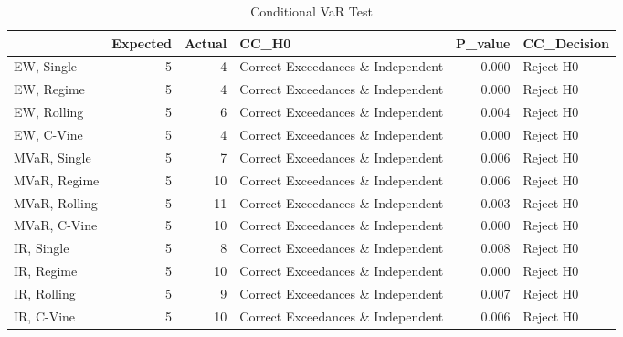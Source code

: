 \begin{table}

\caption{Conditional VaR Test}
\centering
\begin{tabular}[t]{lrrlrl}
\toprule
  & Expected & Actual & CC\_H0 & P\_value & CC\_Decision\\
\midrule
EW, Single & 5 & 4 & Correct Exceedances \& Independent & 0.000 & Reject H0\\
EW, Regime & 5 & 4 & Correct Exceedances \& Independent & 0.000 & Reject H0\\
EW, Rolling & 5 & 6 & Correct Exceedances \& Independent & 0.004 & Reject H0\\
EW, C-Vine & 5 & 4 & Correct Exceedances \& Independent & 0.000 & Reject H0\\
MVaR, Single & 5 & 7 & Correct Exceedances \& Independent & 0.006 & Reject H0\\
\addlinespace
MVaR, Regime & 5 & 10 & Correct Exceedances \& Independent & 0.006 & Reject H0\\
MVaR, Rolling & 5 & 11 & Correct Exceedances \& Independent & 0.003 & Reject H0\\
MVaR, C-Vine & 5 & 10 & Correct Exceedances \& Independent & 0.000 & Reject H0\\
IR, Single & 5 & 8 & Correct Exceedances \& Independent & 0.008 & Reject H0\\
IR, Regime & 5 & 10 & Correct Exceedances \& Independent & 0.000 & Reject H0\\
\addlinespace
IR, Rolling & 5 & 9 & Correct Exceedances \& Independent & 0.007 & Reject H0\\
IR, C-Vine & 5 & 10 & Correct Exceedances \& Independent & 0.006 & Reject H0\\
\bottomrule
\end{tabular}
\end{table}
